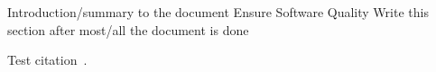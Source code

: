 
Introduction/summary to the document Ensure Software Quality Write this section after most/all the document is done

Test citation~\cite{orviz_fernandez_eosc-synergy_2020}.
